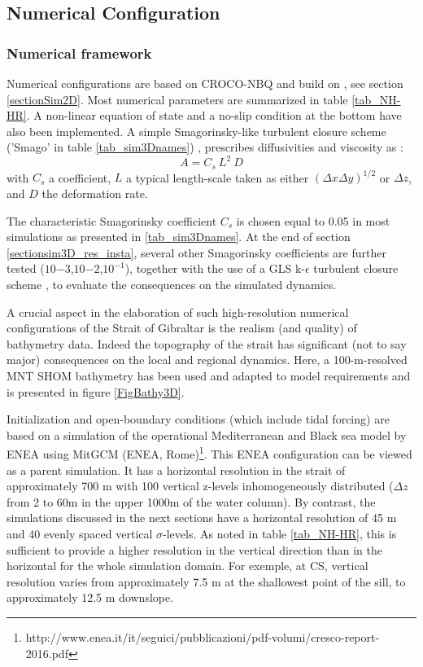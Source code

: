 \subsection{Numerical Configuration}
\label{section3Dnum}

\subsubsection{Numerical framework}

Numerical configurations are based on CROCO-NBQ and build on \citet{hilt_2020}, see section \ref{sectionSim2D}. Most numerical parameters are summarized in table \ref{tab_NH-HR}. A non-linear equation of state and a no-slip condition at the bottom have also been implemented. A simple Smagorinsky-like turbulent closure scheme ('Smago' in table \ref{tab_sim3Dnames}) \citep{smagorinsky_1963}, prescribes diffusivities and viscosity as :
\begin{equation}
    A = C_s \ L^2 \ D
\end{equation}
with $C_s$ a coefficient, $L$ a typical length-scale taken as either $(\Delta x \Delta y)^{1/2}$ or $\Delta z$, and $D$ the deformation rate.

The characteristic Smagorinsky coefficient $C_s$ is chosen equal to 0.05 in most simulations as presented in \ref{tab_sim3Dnames}. At the end of section \ref{sectionsim3D_res_insta}, several other Smagorinsky coefficients are further tested  ($10{-3}$,$10{-2}$,$10^{-1}$), together with the use of a GLS k-$\epsilon$ turbulent closure scheme \citep{umlauf_2003}, to evaluate the consequences on the simulated dynamics.

A crucial aspect in the elaboration of such high-resolution numerical configurations of the Strait of Gibraltar is the realism (and quality) of bathymetry data. Indeed the topography of the strait has significant (not to say major) consequences on the local and regional dynamics. Here, a 100-m-resolved MNT SHOM bathymetry has been used and adapted to model requirements and is presented in figure \ref{FigBathy3D}.

Initialization and open-boundary conditions (which include tidal forcing) are based on a simulation of the operational Mediterranean and Black sea model by ENEA using MitGCM (ENEA, Rome)\footnote{http://www.enea.it/it/seguici/pubblicazioni/pdf-volumi/cresco-report-2016.pdf}. This ENEA configuration can be viewed as a parent simulation. It has a horizontal resolution in the strait of approximately 700 m with 100 vertical z-levels inhomogeneously distributed ($\Delta z$ from 2 to 60m in the upper 1000m of the water column). By contrast, the simulations discussed in the next sections have a horizontal resolution of 45 m and 40 evenly spaced vertical $\sigma$-levels. As noted in table \ref{tab_NH-HR}, this is sufficient to provide a higher resolution in the vertical direction than in the horizontal for the whole simulation domain. For exemple, at CS, vertical resolution varies from approximately 7.5 m at the shallowest point of the sill, to approximately 12.5 m downslope.


